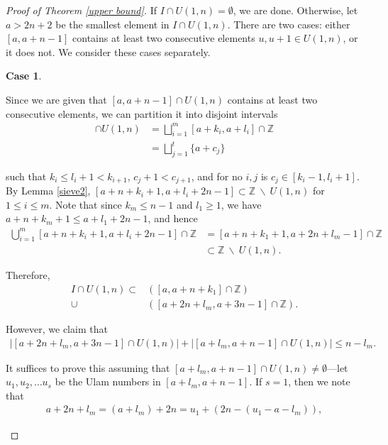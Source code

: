 \documentclass{amsart}
\newcommand{\ZZ}{\mathbb{Z}}
\theoremstyle{theorem}
\theoremstyle{definition}
\newtheorem{case}{Case}
\begin{document}
\begin{proof}[Proof of Theorem \ref{upper bound}]
If $I \cap U(1,n) = \emptyset$, we are done. Otherwise, let $a > 2n + 2$ be the smallest element in $I \cap U(1,n)$. There are two cases: either $[a, a + n - 1]$ contains at least two consecutive elements $u, u + 1 \in U(1,n)$, or it does not. We consider these cases separately.

\begin{case} \ 

Since we are given that $[a, a+n-1]\cap U(1,n)$ contains at least two consecutive elements, we can partition it into disjoint intervals 
	\begin{align*}
    [a, a+ n - 1] \cap U(1,n) &= \bigsqcup_{i = 1}^m [a + k_i, a + l_i] \cap \ZZ \\
    &= \bigsqcup_{j = 1}^t \{a + c_j\}
    \end{align*}
    
\noindent such that $k_i \leq l_i + 1 < k_{i+1}$, $c_j + 1 < c_{j + 1}$, and for no $i,j$ is $c_j \in [k_i - 1, l_i + 1]$. By Lemma \ref{sieve2}, $[a+n+k_i+1, a+l_i+2n-1] \subset \ZZ \ \backslash \ U(1,n)$ for $1\leq i\leq m$. Note that since $k_m \leq n - 1$ and $l_1 \geq 1$, we have $a+n+k_m+1 \leq a+l_1+2n-1$, and hence
	\begin{align*}\bigcup_{i=1}^m [a+n+k_i+1, a+l_i+2n-1] \cap \ZZ &= [a+n+k_1+1, a+2n+l_m-1] \cap \ZZ \\ &\subset \ZZ \ \backslash \ U(1,n).
    \end{align*}
    
\noindent Therefore,
	\begin{align*}
    I \cap U(1,n) \subset &\left([a, a + n + k_1] \cap \ZZ\right) \\
    \cup &\left([a + 2n + l_m, a + 3n - 1] \cap \ZZ\right).
    \end{align*}

\noindent However, we claim that
	\begin{align*}
    \left|[a + 2n + l_m, a + 3n - 1] \cap U(1,n)\right| + \left|[a + l_m, a + n - 1] \cap U(1,n)\right| \leq n - l_m.
    \end{align*}
    
\noindent It suffices to prove this assuming that $[a + l_m, a + n - 1] \cap U(1,n) \neq \emptyset$---let $u_1, u_2, \ldots u_s$ be the Ulam numbers in $[a + l_m, a + n - 1]$. If $s = 1$, then we note that
	\begin{align*}
    a + 2n + l_m = (a + l_m) + 2n = u_1 + (2n - (u_1 - a - l_m)),
    \end{align*}
    

\end{case}
\end{proof}
\end{document}
